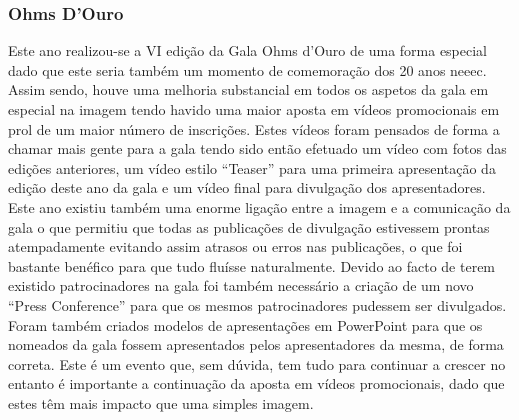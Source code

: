 
\subsubsection{Ohms D'Ouro}

Este ano realizou-se a VI edição da Gala Ohms d’Ouro de uma forma especial dado que este seria também um momento de comemoração dos 20 anos \acrshort{neeec}. Assim sendo, houve uma melhoria substancial em todos os aspetos da gala em especial na imagem tendo havido uma maior aposta em vídeos promocionais em prol de um maior número de inscrições. Estes vídeos foram pensados de forma a chamar mais gente para a gala tendo sido então efetuado um vídeo com fotos das edições anteriores, um vídeo estilo “Teaser” para uma primeira apresentação da edição deste ano da gala e um vídeo final para divulgação dos apresentadores. Este ano existiu também uma enorme ligação entre a imagem e a comunicação da gala o que permitiu que todas as publicações de divulgação estivessem prontas atempadamente evitando assim atrasos ou erros nas publicações, o que foi bastante benéfico para que tudo fluísse naturalmente. Devido ao facto de terem existido patrocinadores na gala foi também necessário a criação de um novo “Press Conference” para que os mesmos patrocinadores pudessem ser divulgados. Foram também criados modelos de apresentações em PowerPoint para que os nomeados da gala fossem apresentados pelos apresentadores da mesma, de forma correta.
Este é um evento que, sem dúvida, tem tudo para continuar a crescer no entanto é importante a continuação da aposta em vídeos promocionais, dado que estes têm mais impacto que uma simples imagem.
